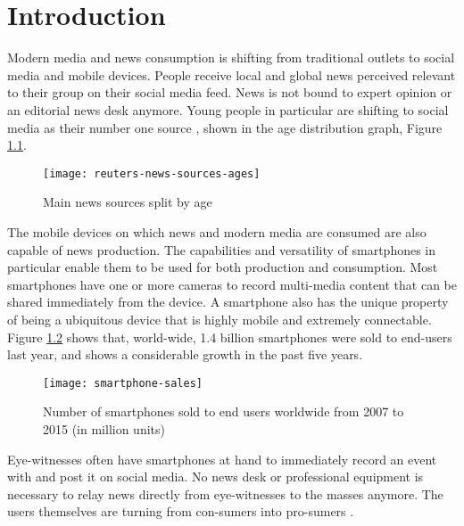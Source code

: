 \chapter{Introduction}\label{ch:intro}

Modern media and news consumption is shifting from traditional outlets to social media and mobile devices.
People receive local and global news perceived relevant to their group on their social media feed.
News is not bound to expert opinion or an editorial news desk anymore.
Young people in particular are shifting to social media as their number one source \cite{reuters_social_media}, shown in the age distribution graph, Figure \ref{fig:reuters-news-sources-ages}.
\begin{figure}[H]
	\centering
	\texttt{[image: reuters-news-sources-ages]}
	\caption{Main news sources split by age \cite{reuters_social_media}}
	\label{fig:reuters-news-sources-ages}
\end{figure}
The mobile devices on which news and modern media are consumed are also capable of news production.
The capabilities and versatility of smartphones in particular enable them to be used for both production and consumption.
Most smartphones have one or more cameras to record multi-media content that can be shared immediately from the device.
A smartphone also has the unique property of being a ubiquitous device that is highly mobile and extremely connectable.
Figure \ref{fig:smartphone-sales} shows that, world-wide, 1.4 billion smartphones were sold to end-users last year, and shows a considerable growth in the past five years.
\begin{figure}[H]
	\centering
	\texttt{[image: smartphone-sales]}
	\caption{Number of smartphones sold to end users worldwide from 2007 to 2015 (in million units) \cite{smartphone-sales}}
	\label{fig:smartphone-sales}
\end{figure}
Eye-witnesses often have smartphones at hand to immediately record an event with and post it on social media.
No news desk or professional equipment is necessary to relay news directly from eye-witnesses to the masses anymore.
The users themselves are turning from con-sumers into pro-sumers \cite{news_crowd}.










